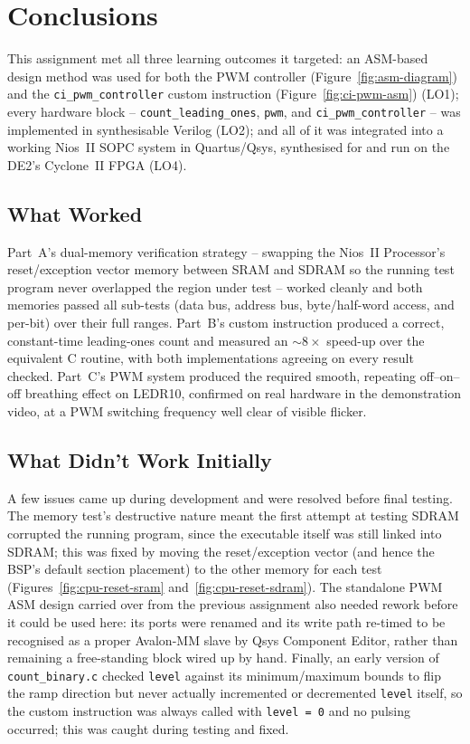 \documentclass[
    12pt,
    a4paper
]{report}
\begin{document}
\chapter{Conclusions}

This assignment met all three learning outcomes it targeted: an ASM-based design method was used
for both the PWM controller (Figure~\ref{fig:asm-diagram}) and the \texttt{ci\_pwm\_controller}
custom instruction (Figure~\ref{fig:ci-pwm-asm}) (LO1); every hardware block --
\texttt{count\_leading\_ones}, \texttt{pwm}, and \texttt{ci\_pwm\_controller} -- was implemented in
synthesisable Verilog (LO2); and all of it was integrated into a working Nios~II SOPC system in
Quartus/Qsys, synthesised for and run on the DE2's Cyclone~II FPGA (LO4).

\section{What Worked}

Part~A's dual-memory verification strategy -- swapping the Nios~II Processor's reset/exception
vector memory between SRAM and SDRAM so the running test program never overlapped the region under
test -- worked cleanly and both memories passed all sub-tests (data bus, address bus, byte/half-word
access, and per-bit) over their full ranges. Part~B's custom instruction produced a correct,
constant-time leading-ones count and measured an $\sim\!8\times$ speed-up over the equivalent C
routine, with both implementations agreeing on every result checked. Part~C's PWM system produced
the required smooth, repeating off--on--off breathing effect on LEDR10, confirmed on real hardware
in the demonstration video, at a PWM switching frequency well clear of visible flicker.

\section{What Didn't Work Initially}

A few issues came up during development and were resolved before final testing. The memory test's
destructive nature meant the first attempt at testing SDRAM corrupted the running program, since
the executable itself was still linked into SDRAM; this was fixed by moving the reset/exception
vector (and hence the BSP's default section placement) to the other memory for each test
(Figures~\ref{fig:cpu-reset-sram} and~\ref{fig:cpu-reset-sdram}). The standalone PWM ASM design
carried over from the previous assignment also needed rework before it could be used here: its
ports were renamed and its write path re-timed to be recognised as a proper Avalon-MM slave by
Qsys Component Editor, rather than remaining a free-standing block wired up by hand. Finally, an
early version of \texttt{count\_binary.c} checked \texttt{level} against its minimum/maximum
bounds to flip the ramp direction but never actually incremented or decremented \texttt{level}
itself, so the custom instruction was always called with \texttt{level~=~0} and no pulsing
occurred; this was caught during testing and fixed.
\end{document}
